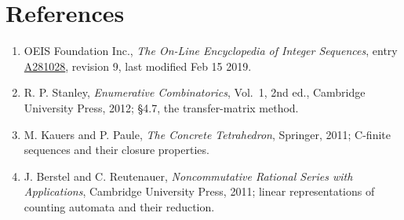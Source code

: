 \documentclass[11pt]{article}
\theoremstyle{definition}
\begin{document}
\section{References}

\begin{enumerate}

\item OEIS Foundation Inc., \emph{The On-Line Encyclopedia of Integer Sequences}, entry \href{https://oeis.org/A281028}{A281028}, revision 9, last modified Feb 15 2019.

\item R. P. Stanley, \emph{Enumerative Combinatorics}, Vol.~1, 2nd ed., Cambridge University Press, 2012; \S4.7, the transfer-matrix method.

\item M. Kauers and P. Paule, \emph{The Concrete Tetrahedron}, Springer, 2011; C-finite sequences and their closure properties.

\item J. Berstel and C. Reutenauer, \emph{Noncommutative Rational Series with Applications}, Cambridge University Press, 2011; linear representations of counting automata and their reduction.

\end{enumerate}
\end{document}

